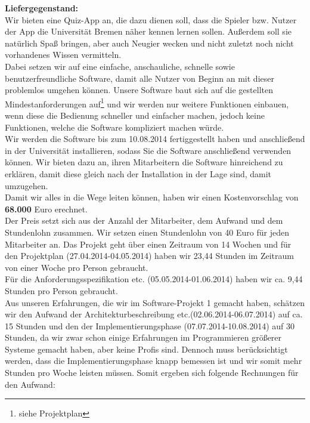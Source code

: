\documentclass[fontsize=12pt,paper=a4,twoside]{scrartcl}
\begin{document}
\textbf{Liefergegenstand:}\\
Wir bieten eine Quiz-App an, die dazu dienen soll, dass die Spieler bzw. Nutzer der App die Universität Bremen näher kennen lernen sollen. Außerdem soll sie natürlich Spaß bringen, aber auch Neugier wecken und nicht zuletzt noch nicht vorhandenes Wissen vermitteln.\\
Dabei setzen wir auf eine einfache, anschauliche, schnelle sowie benutzerfreundliche Software, damit alle Nutzer von Beginn an mit dieser problemlos umgehen können. Unsere Software baut sich auf die gestellten Mindestanforderungen auf\footnote{siehe Projektplan} und wir werden nur weitere Funktionen einbauen, wenn diese die Bedienung schneller und einfacher machen, jedoch keine Funktionen, welche die Software kompliziert machen würde.\\
Wir werden die Software bis zum 10.08.2014 fertiggestellt haben und anschließend in der Universität installieren, sodass Sie die Software anschließend verwenden können. Wir bieten dazu an, ihren Mitarbeitern die Software hinreichend zu erklären, damit diese gleich nach der Installation in der Lage sind, damit umzugehen.\\
Damit wir alles in die Wege leiten können, haben wir einen Kostenvorschlag von \textbf{68.000} Euro erechnet.\\
Der Preis setzt sich aus der Anzahl der Mitarbeiter, dem Aufwand und dem Stundenlohn zusammen. Wir setzen einen Stundenlohn von 40 Euro für jeden Mitarbeiter an. Das Projekt geht über einen Zeitraum von 14 Wochen und für den Projektplan (27.04.2014-04.05.2014) haben wir 23,44 Stunden im Zeitraum von einer Woche pro Person gebraucht. \\
Für die Anforderungsspezifikation etc. (05.05.2014-01.06.2014) haben wir ca. 9,44 Stunden pro Person gebraucht. \\
Aus unseren Erfahrungen, die wir im Software-Projekt 1 gemacht haben, schätzen wir den Aufwand der Architekturbeschreibung etc.(02.06.2014-06.07.2014) auf ca. 15 Stunden und den der Implementierungsphase (07.07.2014-10.08.2014) auf 30 Stunden, da wir zwar schon einige Erfahrungen im Programmieren größerer Systeme gemacht haben, aber keine Profis sind. Dennoch muss berücksichtigt werden, dass die Implementierungsphase knapp bemessen ist und wir somit mehr Stunden pro Woche leisten müssen. Somit ergeben sich folgende Rechnungen für den Aufwand:\\
\end{document}
